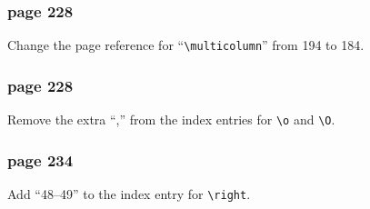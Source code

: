 \subsubsection*{page 228}
Change the page reference for ``\verb|\multicolumn|''
from 194  to 184.
 
\subsubsection*{page 228}
Remove the extra ``,'' from the index entries for \verb|\o|
and \verb|\O|.
 
 
\subsubsection*{page 234}
Add ``48--49'' to the index entry for \verb|\right|.
